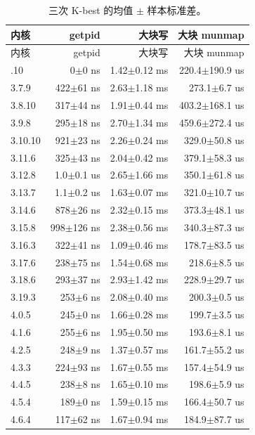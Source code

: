 \begin{longtable}{@{}lrrr@{}}
\caption{三次 K-best 的均值 $\pm$ 样本标准差。}\label{tab:kernels}\\
\toprule
内核 & getpid & 大块写 & 大块 munmap \\
\midrule
\endfirsthead
\toprule
内核 & getpid & 大块写 & 大块 munmap \\
\midrule
\endhead
\bottomrule
\endfoot
3.6.10 & 0$\pm$0 ns & 1.42$\pm$0.12 ms & 220.4$\pm$190.9 us \\
3.7.9 & 422$\pm$61 ns & 2.63$\pm$1.18 ms & 273.1$\pm$6.7 us \\
3.8.10 & 317$\pm$44 ns & 1.91$\pm$0.44 ms & 403.2$\pm$168.1 us \\
3.9.8 & 295$\pm$18 ns & 2.70$\pm$1.34 ms & 459.6$\pm$272.4 us \\
3.10.10 & 921$\pm$23 ns & 2.26$\pm$0.24 ms & 329.0$\pm$50.8 us \\
3.11.6 & 325$\pm$43 ns & 2.04$\pm$0.42 ms & 379.1$\pm$58.3 us \\
3.12.8 & 1.0$\pm$0.1 us & 2.65$\pm$1.66 ms & 350.1$\pm$61.8 us \\
3.13.7 & 1.1$\pm$0.2 us & 1.63$\pm$0.07 ms & 321.0$\pm$10.7 us \\
3.14.6 & 878$\pm$26 ns & 2.32$\pm$0.15 ms & 373.3$\pm$48.1 us \\
3.15.8 & 998$\pm$126 ns & 2.38$\pm$0.56 ms & 340.3$\pm$87.3 us \\
3.16.3 & 322$\pm$41 ns & 1.09$\pm$0.46 ms & 178.7$\pm$83.5 us \\
3.17.6 & 238$\pm$75 ns & 1.54$\pm$0.68 ms & 218.6$\pm$8.5 us \\
3.18.6 & 293$\pm$37 ns & 2.93$\pm$1.42 ms & 228.9$\pm$29.7 us \\
3.19.3 & 253$\pm$6 ns & 2.08$\pm$0.40 ms & 200.3$\pm$0.5 us \\
4.0.5 & 245$\pm$0 ns & 1.66$\pm$0.28 ms & 199.7$\pm$3.5 us \\
4.1.6 & 255$\pm$6 ns & 1.95$\pm$0.50 ms & 193.6$\pm$8.1 us \\
4.2.5 & 248$\pm$9 ns & 1.37$\pm$0.57 ms & 161.7$\pm$55.2 us \\
4.3.3 & 224$\pm$93 ns & 1.67$\pm$0.55 ms & 157.4$\pm$54.9 us \\
4.4.5 & 238$\pm$8 ns & 1.65$\pm$0.10 ms & 198.6$\pm$5.9 us \\
4.5.4 & 189$\pm$0 ns & 1.59$\pm$0.15 ms & 166.4$\pm$50.7 us \\
4.6.4 & 117$\pm$62 ns & 1.67$\pm$0.94 ms & 184.9$\pm$87.7 us \\

\end{longtable}
